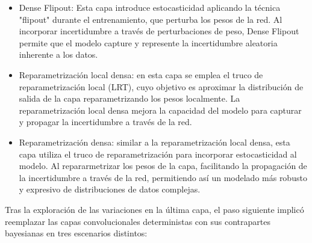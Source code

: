 \documentclass[10pt, oneside, a4paper]{article}
\begin{document}
	\begin{itemize}
		\item Dense Flipout: Esta capa introduce estocasticidad aplicando la técnica "flipout" durante el entrenamiento, que perturba los pesos de la red. Al incorporar incertidumbre a través de perturbaciones de peso, Dense Flipout permite que el modelo capture y represente la incertidumbre aleatoria inherente a los datos.
		
		\item Reparametrización local densa: en esta capa se emplea el truco de reparametrización local (LRT), cuyo objetivo es aproximar la distribución de salida de la capa reparametrizando los pesos localmente. La reparametrización local densa mejora la capacidad del modelo para capturar y propagar la incertidumbre a través de la red.
		
		\item Reparametrización densa: similar a la reparametrización local densa, esta capa utiliza el truco de reparametrización para incorporar estocasticidad al modelo. Al repararmetrizar los pesos de la capa, facilitando la propagación de la incertidumbre a través de la red, permitiendo así un modelado más robusto y expresivo de distribuciones de datos complejas.
	\end{itemize}
	
	Tras la exploración de las variaciones en la última capa, el paso siguiente implicó reemplazar las capas convolucionales deterministas con sus contrapartes bayesianas en tres escenarios distintos:
	
\end{document}
